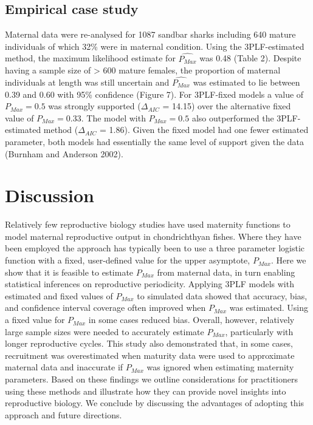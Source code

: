 \documentclass[
]{article}
\begin{document}
\subsection{Empirical case study}\label{empirical-case-study-1}

Maternal data were re-analysed for 1087 sandbar sharks including 640 mature individuals of which 32\% were in maternal condition. Using the 3PLF-estimated method, the maximum likelihood estimate for \(\widehat{P_{Max}}\) was 0.48 (Table 2). Despite having a sample size of \textgreater{} 600 mature females, the proportion of maternal individuals at length was still uncertain and \(\widehat{P_{Max}}\) was estimated to lie between 0.39 and 0.60 with 95\% confidence (Figure 7). For 3PLF-fixed models a value of \(P_{Max} = 0.5\) was strongly supported (\(\Delta_{AIC}\) = 14.15) over the alternative fixed value of \(P_{Max} = 0.33\). The model with \(P_{Max} = 0.5\) also outperformed the 3PLF-estimated method (\(\Delta_{AIC}\) = 1.86). Given the fixed model had one fewer estimated parameter, both models had essentially the same level of support given the data (Burnham and Anderson 2002).

\section{Discussion}\label{discussion}

Relatively few reproductive biology studies have used maternity functions to model maternal reproductive output in chondrichthyan fishes. Where they have been employed the approach has typically been to use a three parameter logistic function with a fixed, user-defined value for the upper asymptote, \(P_{Max}\). Here we show that it is feasible to estimate \(P_{Max}\) from maternal data, in turn enabling statistical inferences on reproductive periodicity. Applying 3PLF models with estimated and fixed values of \(P_{Max}\) to simulated data showed that accuracy, bias, and confidence interval coverage often improved when \(P_{Max}\) was estimated. Using a fixed value for \(P_{Max}\) in some cases reduced bias. Overall, however, relatively large sample sizes were needed to accurately estimate \(P_{Max}\), particularly with longer reproductive cycles. This study also demonstrated that, in some cases, recruitment was overestimated when maturity data were used to approximate maternal data and inaccurate if \(P_{Max}\) was ignored when estimating maternity parameters. Based on these findings we outline considerations for practitioners using these methods and illustrate how they can provide novel insights into reproductive biology. We conclude by discussing the advantages of adopting this approach and future directions.
\end{document}
